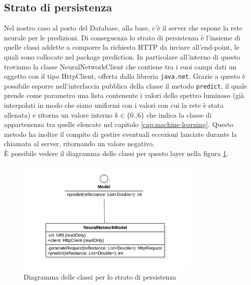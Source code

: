 \subsection{Strato di persistenza}
Nel nostro caso al posto del Database, alla base, c'è il server che espone la rete neurale per le predizioni. Di conseguenza lo strato di persistenza è l'insieme di quelle classi addette a comporre la richiesta HTTP da inviare all'end-point, le quali sono collocate nel package prediction. In particolare all'interno di questo troviamo la classe NeuralNetworkClient che contiene tra i suoi campi dati un oggetto con il tipo HttpClient, offerta dalla libreria \verb|java.net|. Grazie a questo è possibile esporre nell'interfaccia pubblica della classe il metodo \verb|predict|, il quale prende come parametro una lista contenente i valori dello spettro luminoso (già interpolati in modo che siano uniformi con i valori con cui la rete è stata allenata) e ritorna un valore interno $k \in \{0 .. 6 \}$ che indica la classe di appartenenza tra quelle elencate nel capitolo \ref{cap:machine-learning}. Questo metodo ha inoltre il compito di gestire eventuali eccezioni lanciate durante la chiamata al server, ritornando un valore negativo.\\
È possibile vedere il diagramma delle classi per questo layer nella figura \ref{fig:class_diagram_persistence}.

\begin{figure}
    \centering
    \includegraphics[width=0.8\textwidth]{immagini/model_classes.png}
    \caption{Diagramma delle classi per lo strato di persistenza}
    \label{fig:class_diagram_persistence}
\end{figure}

